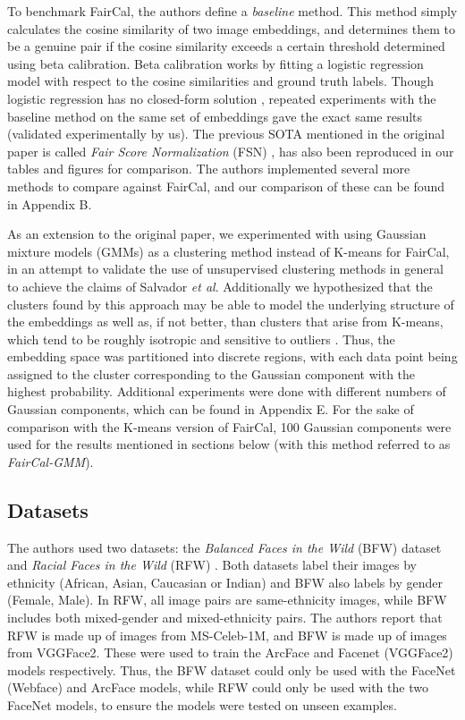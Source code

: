  To benchmark FairCal, the authors define a \textit{baseline} method. This method simply calculates the cosine similarity of two image embeddings, and determines them to be a genuine pair if the cosine similarity exceeds a certain threshold determined using beta calibration. Beta calibration works by fitting a logistic regression model with respect to the cosine similarities and ground truth labels. Though logistic regression has no closed-form solution \citep{bishop2006pattern}, repeated experiments with the baseline method on the same set of embeddings gave the exact same results (validated experimentally by us). The previous SOTA mentioned in the original paper is called \textit{Fair Score Normalization} (FSN) \cite{TERHORST2020332}, has also been reproduced in our tables and figures for comparison. The authors implemented several more methods to compare against FairCal, and our comparison of these can be found in Appendix B.
 
As an extension to the original paper, we experimented with using Gaussian mixture models (GMMs) \citep{bishop2006pattern} as a clustering method instead of K-means for FairCal, in an attempt to validate the use of unsupervised clustering methods in general to achieve the claims of Salvador \textit{et al}. Additionally we hypothesized that the clusters found by this approach may be able to model the underlying structure of the embeddings as well as, if not better, than clusters that arise from K-means, which tend to be roughly isotropic and sensitive to outliers  \citep{raykov2016k}. Thus, the embedding space was partitioned into discrete regions, with each data point being assigned to the cluster corresponding to the Gaussian component with the highest probability. Additional experiments were done with different numbers of Gaussian components, which can be found in Appendix E. For the sake of comparison with the K-means version of FairCal, 100 Gaussian components were used for the results mentioned in sections below (with this method referred to as \textit{FairCal-GMM}).
 
\subsection{Datasets}\label{sec:datasets}
The authors used two datasets: the \textit{Balanced Faces in the Wild} (BFW) dataset \citep{robinson2020face} and \textit{Racial Faces in the Wild} (RFW) \citep{Wang2019ICCV}. Both datasets label their images by ethnicity (African, Asian, Caucasian or Indian) and BFW also labels by gender (Female, Male). In RFW, all image pairs are same-ethnicity images, while BFW includes both mixed-gender and mixed-ethnicity pairs. The authors report that RFW is made up of images from MS-Celeb-1M, and BFW is made up of images from VGGFace2. These were used to train the ArcFace and Facenet (VGGFace2) models respectively. Thus, the BFW dataset could only be used with the FaceNet (Webface) and ArcFace models, while RFW could only be used with the two FaceNet models, to ensure the models were tested on unseen examples.

